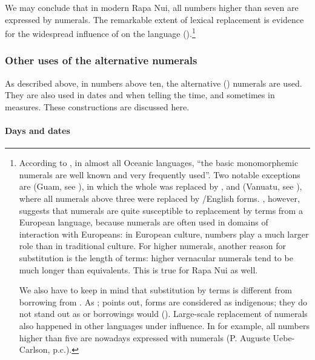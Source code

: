 We may conclude that in modern Rapa Nui, all numbers higher than seven are expressed by  numerals. The remarkable extent of lexical replacement is evidence for the widespread influence of  on the language ().\footnote{\label{fn:171}According to \citet[37]{LynchSpriggs1995}, in almost all Oceanic languages, “the basic monomorphemic numerals are well known and very frequently used”. Two notable exceptions are  (Guam, see \citealt[166]{Topping1973}), in which the whole  was replaced by , and  (Vanuatu, see \citealt{LynchSpriggs1995}), where all numerals above three were replaced by /English forms. \citet{Clark2004}, however, suggests that numerals are quite susceptible to replacement by terms from a European language, because numerals are often used in domains of interaction with Europeans: in European culture, numbers play a much larger role than in traditional culture. For higher numerals, another reason for substitution is the length of terms: higher vernacular numerals tend to be much longer than  equivalents. This is true for Rapa Nui as well. 

We also have to keep in mind that substitution by  terms is different from borrowing from . As \citet[397]{Fischer2007}; \citet[151]{Fischer2008Reversing} points out,  forms are considered as indigenous; they do not stand out as  or  borrowings would (). Large-scale replacement of numerals also happened in other languages under  influence. In  for example, all numbers higher than five are nowadays expressed with  numerals (P. Auguste Uebe-Carlson, p.c.).}

\subsubsection[Other uses of the alternative numerals]{Other uses of the alternative numerals}\label{sec:4.3.1.1}

As described above, in numbers above ten, the alternative () numerals are used. They are also used in dates and when telling the time, and sometimes in measures. These constructions are discussed here.

\paragraph[Days and dates]{Days and dates}\label{sec:4.3.1.1.1}

